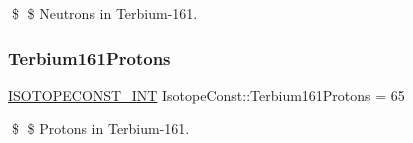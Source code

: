 \$ \$ Neutrons in Terbium-\/161. \mbox{\label{group___isotope_const-_terbium-_tb161_ga19373937025636d48bfc7b0deca6b08e}} 
\subsubsection{\texorpdfstring{Terbium161\+Protons}{Terbium161Protons}}
{\footnotesize\ttfamily \mbox{\hyperlink{group___isotope_const-_macros_ga5f18360b3e99483a35c32d789e62621c}{I\+S\+O\+T\+O\+P\+E\+C\+O\+N\+S\+T\+\_\+\+I\+NT}} Isotope\+Const\+::\+Terbium161\+Protons = 65}

\$ \$ Protons in Terbium-\/161. 